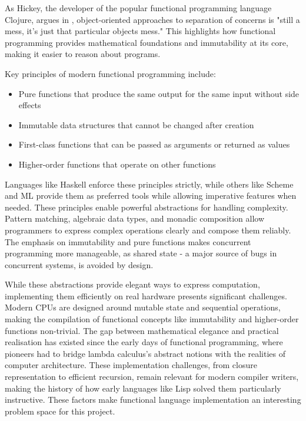 \documentclass[final]{cmpreport_02}
\begin{document}
As Hickey, the developer of the popular functional programming language Clojure, argues in \cite{hickey2009there}, object-oriented approaches to separation of concerns is "still a mess, it's just that particular objects mess." This highlights how functional programming provides mathematical foundations and immutability at its core, making it easier to reason about programs.

Key principles of modern functional programming include:
\begin{itemize}
    \item Pure functions that produce the same output for the same input without side effects
    \item Immutable data structures that cannot be changed after creation
    \item First-class functions that can be passed as arguments or returned as values
    \item Higher-order functions that operate on other functions
\end{itemize}

Languages like Haskell enforce these principles strictly, while others like Scheme and ML provide them as preferred tools while allowing imperative features when needed. These principles enable powerful abstractions for handling complexity. Pattern matching, algebraic data types, and monadic composition allow programmers to express complex operations clearly and compose them reliably. The emphasis on immutability and pure functions makes concurrent programming more manageable, as shared state - a major source of bugs in concurrent systems, is avoided by design.

While these abstractions provide elegant ways to express computation, implementing them efficiently on real hardware presents significant challenges. Modern CPUs are designed around mutable state and sequential operations, making the compilation of functional concepts like immutability and higher-order functions non-trivial. The gap between mathematical elegance and practical realisation has existed since the early days of functional programming, where pioneers had to bridge lambda calculus's abstract notions with the realities of computer architecture. These implementation challenges, from closure representation to efficient recursion, remain relevant for modern compiler writers, making the history of how early languages like Lisp solved them particularly instructive. These factors make functional language implementation an interesting problem space for this project.
\end{document}
